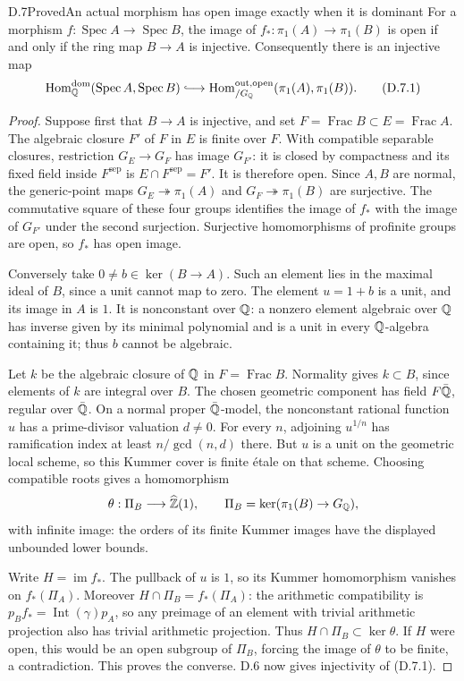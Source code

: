 \begin{statement}{D.7}{Proved}{An actual morphism has open image exactly when it is dominant}
For a morphism $f:\operatorname{Spec}A\to\operatorname{Spec}B$,
the image of $f_*:\pi_1(A)\to\pi_1(B)$ is open if and only if
the ring map $B\to A$ is injective.  Consequently there is an
injective map
\[
 \operatorname{Hom}^{\mathrm{dom}}_\Q
       (\operatorname{Spec}A,\operatorname{Spec}B)
 \lhook\joinrel\longrightarrow
 \operatorname{Hom}^{\mathrm{out,open}}_{/G_\Q}
       (\pi_1(A),\pi_1(B)).                       \tag{D.7.1}
\]
\end{statement}
\begin{proof}
Suppose first that $B\to A$ is injective, and set
$F=\operatorname{Frac}B\subset E=\operatorname{Frac}A$.
The algebraic closure $F'$ of $F$ in $E$ is finite over $F$.
With compatible separable closures, restriction $G_E\to G_F$
has image $G_{F'}$: it is closed by compactness and its fixed
field inside $F^{\mathrm{sep}}$ is $E\cap F^{\mathrm{sep}}=F'$.
It is therefore open.  Since $A,B$ are normal, the generic-point
maps $G_E\twoheadrightarrow\pi_1(A)$ and
$G_F\twoheadrightarrow\pi_1(B)$ are surjective.  The commutative
square of these four groups identifies the image of $f_*$ with
the image of $G_{F'}$ under the second surjection.  Surjective
homomorphisms of profinite groups are open, so $f_*$ has open image.

Conversely take $0\ne b\in\ker(B\to A)$.  Such an element lies
in the maximal ideal of $B$, since a unit cannot map to zero.
The element $u=1+b$ is a unit, and its image in $A$ is $1$.
It is nonconstant over $\mathbb Q$: a nonzero element algebraic over
$\mathbb Q$ has inverse given by its minimal polynomial and is a unit
in every $\mathbb Q$-algebra containing it; thus $b$ cannot be algebraic.

Let $k$ be the algebraic closure of $\mathbb Q$ in $F=\operatorname{Frac}B$.
Normality gives $k\subset B$, since elements of $k$ are integral
over $B$.  The chosen geometric component has field
$F\bar{\mathbb Q}$, regular over $\bar{\mathbb Q}$.  On a normal proper
$\bar{\mathbb Q}$-model, the nonconstant rational function $u$ has a
prime-divisor valuation $d\ne0$.  For every $n$, adjoining
$u^{1/n}$ has ramification index at least $n/\gcd(n,d)$ there.
But $u$ is a unit on the geometric local scheme, so this Kummer
cover is finite \'etale on that scheme.  Choosing compatible roots
gives a homomorphism
\[
 \theta:\Pi_B\longrightarrow\widehat{\mathbb Z}(1),\qquad
 \Pi_B=\ker(\pi_1(B)\to G_\mathbb Q),
\]
with infinite image: the orders of its finite Kummer images have
the displayed unbounded lower bounds.

Write $H=\operatorname{im}f_*$.  The pullback of $u$ is $1$, so
its Kummer homomorphism vanishes on $f_*(\Pi_A)$.
Moreover $H\cap\Pi_B=f_*(\Pi_A)$: the arithmetic compatibility
is $p_Bf_*=\operatorname{Int}(\gamma)p_A$, so any preimage of
an element with trivial arithmetic projection also has trivial
arithmetic projection.
Thus $H\cap\Pi_B\subset\ker\theta$.  If $H$ were open, this
would be an open subgroup of $\Pi_B$, forcing the image of
$\theta$ to be finite, a contradiction.  This proves the converse.
D.6 now gives injectivity of (D.7.1).
\end{proof}

